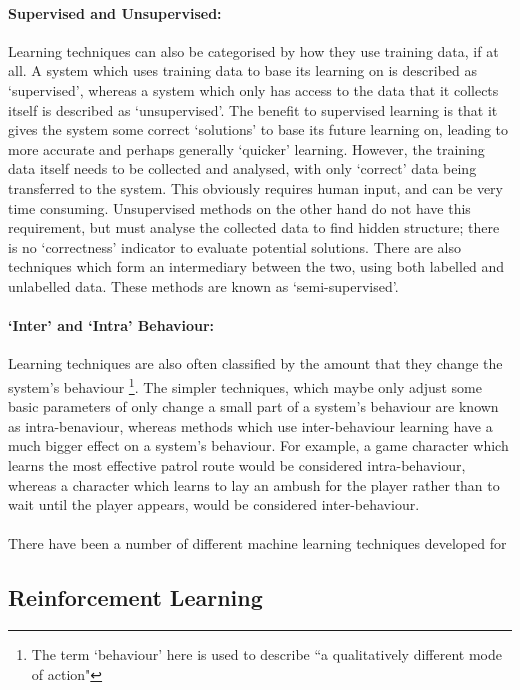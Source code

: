 \documentclass[a4paper,oneside]{report}
\begin{document}
\paragraph{Supervised and Unsupervised:} Learning techniques can also be categorised by how they use training data, if at all. A system which uses training data to base its learning on is described as `supervised', whereas a system which only has access to the data that it collects itself is described as `unsupervised'. The benefit to supervised learning is that it gives the system some correct `solutions' to base its future learning on, leading to more accurate and perhaps generally `quicker' learning. However, the training data itself needs to be collected and analysed, with only `correct' data being transferred to the system. This obviously requires human input, and can be very time consuming. Unsupervised methods on the other hand do not have this requirement, but must analyse the collected data to find hidden structure; there is no `correctness' indicator to evaluate potential solutions. There are also techniques which form an intermediary between the two, using both labelled and unlabelled data. These methods are known as `semi-supervised'.

\paragraph{`Inter' and `Intra' Behaviour:} Learning techniques are also often classified by the amount that they change the system's behaviour \footnote[1]{The term `behaviour' here is used to describe ``a qualitatively different mode of action" }. The simpler techniques, which maybe only adjust some basic parameters of only change a small part of a system's behaviour are known as intra-benaviour, whereas methods which use inter-behaviour learning have a much bigger effect on a system's behaviour. For example, a game character which learns the most effective patrol route would be considered intra-behaviour, whereas a character which learns to lay an ambush for the player rather than to wait until the player appears, would be considered inter-behaviour.

\paragraph{} There have been a number of different machine learning techniques developed for 

\subsection{Reinforcement Learning}
\end{document}
